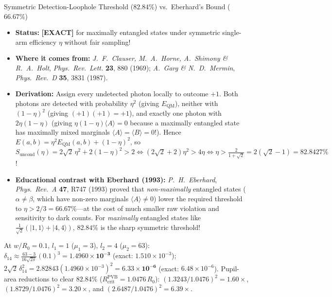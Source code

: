\documentclass[10pt,letterpaper]{article}
\newcommand{\ket}[1]{\lvert #1 \rangle}
\newcommand{\tagexact}{\textcolor{forest}{\textbf{[EXACT]}}}
\numberwithin{equation}{section}
\begin{document}
\begin{approxbox}{Symmetric Detection-Loophole Threshold ($82.84\%$) vs.\ Eberhard's Bound ($66.67\%$)}
\begin{itemize}[leftmargin=1.4em,itemsep=2pt,topsep=1pt]
  \item \textbf{Status:} \tagexact{} for maximally entangled states under symmetric single-arm efficiency $\eta$ without fair sampling!
  \item \textbf{Where it comes from:} \emph{J.\ F.\ Clauser, M.\ A.\ Horne, A.\ Shimony \& R.\ A.\ Holt}, \emph{Phys.\ Rev.\ Lett.} \textbf{23}, 880 (1969); \emph{A.\ Garg \& N.\ D.\ Mermin}, \emph{Phys.\ Rev.\ D} \textbf{35}, 3831 (1987).
  \item \textbf{Derivation:} Assign every undetected photon locally to outcome $+1$. Both photons are detected with probability $\eta^2$ (giving $E_{\mathrm{QM}}$), neither with $(1-\eta)^2$ (giving $(+1)(+1) = +1$), and exactly one photon with $2\eta(1-\eta)$ (giving $\eta(1-\eta)\langle A\rangle = 0$ because a maximally entangled state has maximally mixed marginals $\langle A\rangle = \langle B\rangle = 0$!). Hence $E(a,b) = \eta^2 E_{\mathrm{QM}}(a,b) + (1-\eta)^2$, so $S_{\mathrm{uncond}}(\eta) = 2\sqrt{2}\,\eta^2 + 2(1-\eta)^2 > 2 \iff (2\sqrt{2}+2)\eta^2 > 4\eta \iff \eta > \frac{2}{1+\sqrt{2}} = 2(\sqrt{2}-1) = \mathbf{82.8427\%}$!
  \item \textbf{Educational contrast with Eberhard (1993):} \emph{P.\ H.\ Eberhard}, \emph{Phys.\ Rev.\ A} \textbf{47}, R747 (1993) proved that \emph{non-maximally} entangled states ($\alpha \neq \beta$, which have non-zero marginals $\langle A\rangle \neq 0$) lower the required threshold to $\eta > 2/3 = 66.67\%$---at the cost of much smaller raw violation and sensitivity to dark counts. For \emph{maximally} entangled states like $\frac{1}{\sqrt{2}}(\ket{1,1}+\ket{4,4})$, $82.84\%$ is the sharp symmetric threshold!
\end{itemize}
\end{approxbox}

\begin{pencheck}
At $w/R_0 = 0.1$, $l_1 = 1$ ($\mu_1 = 3$), $l_2 = 4$ ($\mu_2 = 63$): $\delta_{14} \approx \frac{63-3}{16\sqrt{2\pi}}(0.1)^3 = \mathbf{1.4960\times 10^{-3}}$ (exact: $1.510\times 10^{-3}$); $2\sqrt{2}\,\delta_{14}^2 = 2.82843(1.4960\times 10^{-3})^2 = \mathbf{6.33\times 10^{-6}}$ (exact: $6.48\times 10^{-6}$). Pupil-area reductions to clear $82.84\%$ ($R_{\mathrm{crit}}^{\mathrm{PVB}} = 1.0476\,R_0$): $(1.3243/1.0476)^2 = \mathbf{1.60\times}$, $(1.8729/1.0476)^2 = \mathbf{3.20\times}$, and $(2.6487/1.0476)^2 = \mathbf{6.39\times}$.
\end{pencheck}
\end{document}
